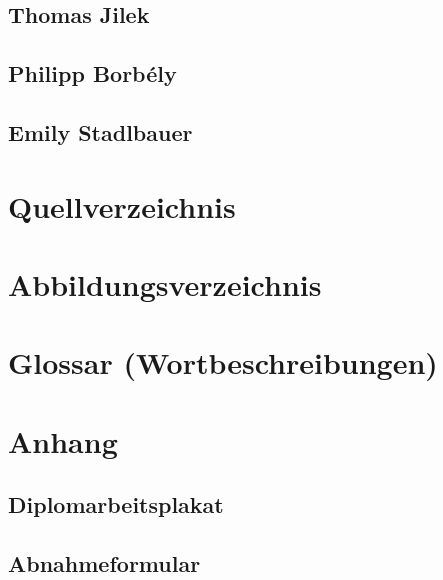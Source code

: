 \documentclass[pdftex,11pt,a4paper,oneside]{book}
\begin{document}
\section{Thomas Jilek}
\section{Philipp Borbély}
\section{Emily Stadlbauer}

\chapter{Quellverzeichnis}

\chapter{Abbildungsverzeichnis}

\chapter{Glossar (Wortbeschreibungen)}

\chapter{Anhang}
\section{Diplomarbeitsplakat}
\section{Abnahmeformular}
\end{document}
